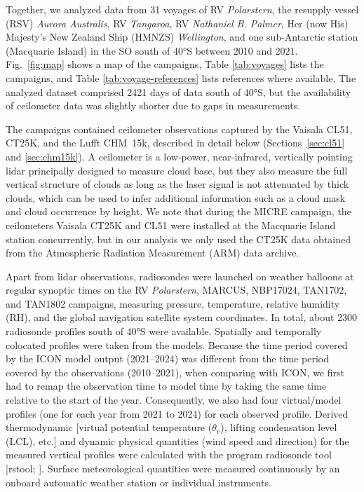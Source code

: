\documentclass[draft]{agujournal2019}
\begin{document}
Together, we analyzed data from 31 voyages of RV \emph{Polarstern}, the resupply vessel (RSV) \emph{Aurora Australis}, RV \emph{Tangaroa}, RV \emph{Nathaniel B. Palmer}, Her (now His) Majesty's New Zealand Ship (HMNZS) \emph{Wellington}, and one sub-Antarctic station (Macquarie Island) in the SO south of 40°S between 2010 and 2021. Fig.~\ref{fig:map} shows a map of the campaigns, Table \ref{tab:voyages} lists the campaigns, and Table \ref{tab:voyage-references} lists references where available. The analyzed dataset comprised 2421 days of data south of 40°S, but the availability of ceilometer data was slightly shorter due to gaps in measurements.

The campaigns contained ceilometer observations captured by the Vaisala CL51, CT25K, and the Lufft CHM~15k, described in detail below (Sections~\ref{sec:cl51} and \ref{sec:chm15k}). A ceilometer is a low-power, near-infrared, vertically pointing lidar principally designed to measure cloud base, but they also measure the full vertical structure of clouds as long as the laser signal is not attenuated by thick clouds, which can be used to infer additional information such as a cloud mask and cloud occurrence by height. We note that during the MICRE campaign, the ceilometers Vaisala CT25K and CL51 were installed at the Macquarie Island station concurrently, but in our analysis we only used the CT25K data obtained from the Atmospheric Radiation Measurement (ARM) data archive.

Apart from lidar observations, radiosondes were launched on weather balloons at regular synoptic times on the RV \emph{Polarstern}, MARCUS, NBP17024, TAN1702, and TAN1802 campaigns, measuring pressure, temperature, relative humidity (RH), and the global navigation satellite system coordinates. In total, about 2300 radiosonde profiles south of 40°S were available. Spatially and temporally colocated profiles were taken from the models. Because the time period covered by the ICON model output (2021--2024) was different from the time period covered by the observations (2010--2021), when comparing with ICON, we first had to remap the observation time to model time by taking the same time relative to the start of the year. Consequently, we also had four virtual/model profiles (one for each year from 2021 to 2024) for each observed profile. Derived thermodynamic [virtual potential temperature ($\theta_v$), lifting condensation level (LCL), etc.] and dynamic physical quantities (wind speed and direction) for the measured vertical profiles were calculated with the program radiosonde tool [rstool; ]. Surface meteorological quantities were measured continuously by an onboard automatic weather station or individual instruments.
\end{document}
